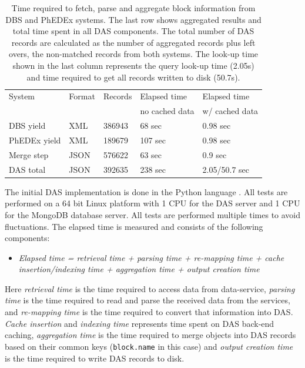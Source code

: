 \documentclass[3p,times]{elsarticle}
\begin{document}
\begin{table}[hbt]
\centering
\begin{tabular}{lllll}\hline
\hline
System & Format & Records & Elapsed time & Elapsed time \\
& & & no cached data & w/ cached data \\
\hline
DBS yield & XML & 386943 & 68 sec & 0.98 sec \\
PhEDEx yield & XML & 189679 & 107 sec & 0.98 sec \\
Merge step & JSON & 576622 & 63 sec & 0.9 sec \\
DAS total & JSON & 392635 & 238 sec & 2.05/50.7 sec \\
\hline
\hline
\end{tabular}
\caption{Time required to fetch, parse and aggregate block information
from DBS and PhEDEx systems. The last row shows aggregated results and 
total time spent in all DAS components.
The total number of DAS records are calculated as the number of 
aggregated records plus left overs, the non-matched records from both systems. 
The look-up time shown in the last column represents the query look-up 
time (2.05s) and time required to get all records written 
to disk (50.7s).}
\label{DAS_benchmark}
\end{table}

The initial DAS implementation is done in the Python language \cite{Python}.
All tests are performed on a 64 bit Linux platform with
1 CPU for the DAS server and 1 CPU for the MongoDB database server. 
All tests are performed multiple times to avoid fluctuations. 
The elapsed time is measured and consists of the following components:
\begin{itemize}
\item[]
{\it
Elapsed time = retrieval time + parsing time + re-mapping time 
        + cache insertion/indexing time 
        + aggregation time + output creation time
}
\end{itemize}
Here {\it retrieval time} is the time required to access data from data-service,
{\it parsing time} is the time required to read and parse the received data
from the services, and {\it re-mapping time} is the time required to convert 
that information into DAS. {\it Cache insertion} and {\it indexing time} 
represents time spent on DAS back-end caching, {\it aggregation time} is
the time required to merge objects into DAS records based
on their common keys (\verb+block.name+ in this case) and {\it output creation time}
is the time required to write DAS records to disk.
\end{document}
